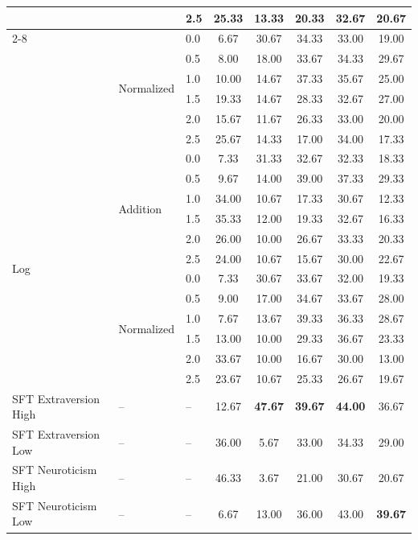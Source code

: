 \begin{table}[htbp]
\begin{tabular}{lll ccccc}
     &  & 2.5 & 25.33 & 13.33 & 20.33 & 32.67 & 20.67 \\
    \cmidrule(lr){2-8}
     & \multirow{6}{*}{Normalized} & 0.0 & 6.67 & 30.67 & 34.33 & 33.00 & 19.00 \\
     &  & 0.5 & 8.00 & 18.00 & 33.67 & 34.33 & 29.67 \\
     &  & 1.0 & 10.00 & 14.67 & 37.33 & 35.67 & 25.00 \\
     &  & 1.5 & 19.33 & 14.67 & 28.33 & 32.67 & 27.00 \\
     &  & 2.0 & 15.67 & 11.67 & 26.33 & 33.00 & 20.00 \\
     &  & 2.5 & 25.67 & 14.33 & 17.00 & 34.00 & 17.33 \\
    \midrule
    \multirow{12}{*}{Log} & \multirow{6}{*}{Addition} & 0.0 & 7.33 & 31.33 & 32.67 & 32.33 & 18.33 \\
     &  & 0.5 & 9.67 & 14.00 & 39.00 & 37.33 & 29.33 \\
     &  & 1.0 & 34.00 & 10.67 & 17.33 & 30.67 & 12.33 \\
     &  & 1.5 & 35.33 & 12.00 & 19.33 & 32.67 & 16.33 \\
     &  & 2.0 & 26.00 & 10.00 & 26.67 & 33.33 & 20.33 \\
     &  & 2.5 & 24.00 & 10.67 & 15.67 & 30.00 & 22.67 \\
    \cmidrule(lr){2-8}
     & \multirow{6}{*}{Normalized} & 0.0 & 7.33 & 30.67 & 33.67 & 32.00 & 19.33 \\
     &  & 0.5 & 9.00 & 17.00 & 34.67 & 33.67 & 28.00 \\
     &  & 1.0 & 7.67 & 13.67 & 39.33 & 36.33 & 28.67 \\
     &  & 1.5 & 13.00 & 10.00 & 29.33 & 36.67 & 23.33 \\
     &  & 2.0 & 33.67 & 10.00 & 16.67 & 30.00 & 13.00 \\
     &  & 2.5 & 23.67 & 10.67 & 25.33 & 26.67 & 19.67 \\
    \midrule
    SFT Extraversion High & -- & -- & 12.67 & \textbf{47.67} & \textbf{39.67} & \textbf{44.00} & 36.67 \\
    SFT Extraversion Low & -- & -- & 36.00 & 5.67 & 33.00 & 34.33 & 29.00 \\
    SFT Neuroticism High & -- & -- & 46.33 & 3.67 & 21.00 & 30.67 & 20.67 \\
    SFT Neuroticism Low & -- & -- & 6.67 & 13.00 & 36.00 & 43.00 & \textbf{39.67} \\
    \bottomrule
  \end{tabular}
\end{table}
